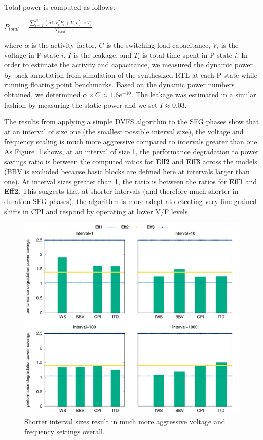 Total power is computed as follows:

\begin{center}
$P_{total} = \frac{\sum\limits_{i=1}^P (\alpha CV_i^2F_i +V_iI) \times T_i}{T_{total}}$
\end{center}

where $\alpha$ is the activity factor, $C$ is the switching load capacitance,  $V_i$ is the voltage in P-state $i$, $I$ is the leakage, and $T_i$ is total time spent in P-state $i$. In order to estimate the activity and capacitance, we measured the dynamic power by back-annotation from simulation of the synthesized RTL at each P-state while running floating point benchmarks. Based on the dynamic power numbers obtained, we determined $\alpha \times C\approx 1.6e^{-10}$. The leakage was estimated in a similar fashion by measuring the static power and we set  $I\approx 0.03$. 

The results from applying a simple DVFS algorithm to the SFG phases show that at an interval of size one (the smallest possible interval size), the voltage and frequency scaling is much more aggressive compared to intervals greater than one. As Figure~\ref{fig:ratiodvfs} shows, at an interval of size 1, the performance degradation to power savings ratio is between the computed ratios for \textbf{Eff2} and \textbf{Eff3} across the models (BBV is excluded because basic blocks are defined here at intervals larger than one). At interval sizes greater than 1, the ratio is between the ratios for \textbf{Eff1} and \textbf{Eff2}. This suggests that at shorter intervals (and therefore much shorter in duration SFG phases), the algorithm is more adept at detecting very fine-grained shifts in CPI and respond by operating at lower V/F levels.  

\begin{figure}[htbp]
  \begin{center}
\includegraphics[width=0.99\columnwidth]{figs/ratiodvfs}
  \end{center}
  \caption{Shorter interval sizes result in much more aggressive voltage and frequency settings overall.} 

  \label{fig:ratiodvfs}
\end{figure}

